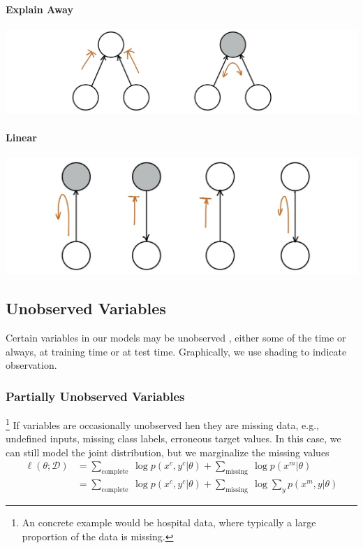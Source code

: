 \documentclass[11pt]{article}
\begin{document}
\paragraph{Explain Away}
\begin{center}
    \includegraphics[scale=0.25]{img/bayes_ball_explain_away}
\end{center}
\paragraph{Linear}
\begin{center}
    \includegraphics[scale=0.25]{img/bayes_ball_linear}
\end{center}

\subsection{Unobserved Variables}
Certain variables in our models may be unobserved , either some of the time or always, at training time or at test time. Graphically, we use shading to indicate observation.
\subsubsection{Partially Unobserved Variables}\footnote{An concrete example would be hospital data, where typically a large proportion of the data is missing. }
If variables are occasionally unobserved hen they are missing data, e.g., undefined inputs, missing class labels, erroneous target values. In this case, we can still model the joint distribution, but we marginalize the missing values
\begin{align*}
    \ell(\theta ; \mathcal{D})&=\sum_{\text {complete }} \log p\left(x^{c}, y^{c} | \theta\right)+\sum_{\text {missing }} \log p\left(x^{m} | \theta\right) \\
    &=\sum_{\text {complete }} \log p\left(x^{c}, y^{c} | \theta\right)+\sum_{\text {missing }} \log \sum_{y} p\left(x^{m}, y | \theta\right)
\end{align*}
\end{document}
